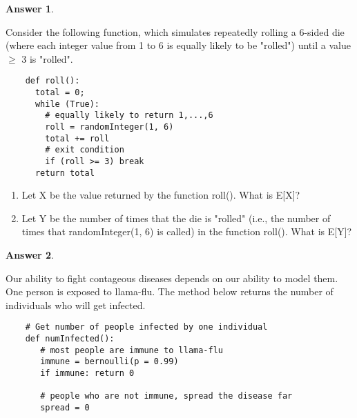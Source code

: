 \documentclass[12pt]{article}
\renewcommand{\(}{\left(}
\renewcommand{\)}{\right)}
\theoremstyle{definition}
\newtheorem*{answer}{Answer}
\begin{document}
\begin{enumerate}
{    \begin{shaded}
    \begin{answer}
    
    \end{answer}
    \end{shaded}
    \newpage
    \item Consider the following function, which simulates repeatedly rolling a 6-sided die (where each integer value from 1 to 6 is equally likely to be "rolled") until a value $\geq$ 3 is "rolled".

    \begin{framed}
    \begin{verbatim}
    def roll():
      total = 0;
      while (True):                    
        # equally likely to return 1,...,6
        roll = randomInteger(1, 6)
        total += roll
        # exit condition
        if (roll >= 3) break           
      return total
    \end{verbatim}
    \end{framed}
    \begin{enumerate}[label=\alph*.]
    \item Let X be the value returned by the function roll().  What is E[X]?


    \item	Let Y be the number of times that the die is "rolled" (i.e., the number of times that randomInteger(1, 6) is called) in the function roll().  What is E[Y]?

    \end{enumerate}
    \begin{shaded}
    \begin{answer}
    
    \end{answer}
    \end{shaded}
    \newpage
    \item Our ability to fight contageous diseases depends on our ability to model them. One person is exposed to llama-flu. The method below returns the number of individuals who will get infected.
    
    \begin{framed}
    \begin{verbatim}
    # Get number of people infected by one individual
    def numInfected():
       # most people are immune to llama-flu
       immune = bernoulli(p = 0.99) 
       if immune: return 0
       
       # people who are not immune, spread the disease far
       spread = 0
       

\end{verbatim}
\end{framed}}
\end{enumerate}
\end{document}
